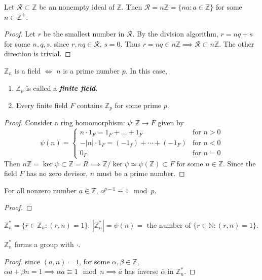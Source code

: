 \documentclass{article}
\begin{document}
\begin{multicols}{2}
\begin{mylemma}
Let $\mathcal{R}\subset \mathbb{Z}$ be an nonempty ideal of $\mathbb{Z}$. Then $\mathcal{R}=n \mathbb{Z} = \{na:a\in \mathbb{Z}\}$ for some $n\in \mathbb{Z}^+$.
\end{mylemma}
\begin{proof}
Let $r$ be the smallest number in $\mathcal{R}$. By the division algorithm, $r=nq+s$ for some $n,q,s$. since $r,nq\in \mathcal{R}$, $s=0$. Thus $r=nq\in n \mathbb{Z} \implies \mathcal{R}\subset n \mathbb{Z}$. The other direction is trivial.
\end{proof}

\begin{mytheorem}
$\mathbb{Z}_n$ is a field $\iff$ $n$ is a prime number $p$. In this case,
\begin{enumerate}[label={(\alph*)}]
\item $\mathbb{Z}_p$ is called a \textbf{\emph{finite field}}.
\item Every finite field $F$ contains $\mathbb{Z}_p$ for some prime $p$.
\end{enumerate}
\end{mytheorem}
\begin{proof}
Consider a ring homomorphism: $\psi: \mathbb{Z}\to F$ given by
$$\psi(n)=\begin{cases}
n\cdot 1_F=1_F+\dots+1_F & \text{for }n>0\\
-|n|\cdot 1_F=(-1_f)+\cdots + (-1_F) & \text{for }n<0\\
0_F & \text{for }n=0
\end{cases}$$
Then $n \mathbb{Z}=\ker \psi\subset \mathbb{Z}=R \implies \mathbb{Z}/\ker \psi \simeq \psi(\mathbb{Z})\subset F$ for some $n\in \mathbb{Z}$. Since the field $F$ has no zero devisor, $n$ must be a prime number.
\end{proof}

\begin{mylemma}
For all nonzero number $a\in \mathbb{Z}$, $a^{p-1}\equiv 1 \mod p$.
\end{mylemma}
\begin{proof}

\end{proof}

\begin{notebox}
$\mathbb{Z}_n^*=\{\overline{r}\in \mathbb{Z}_n:(r,n)=1\}$. $|\mathbb{Z}_n^*|=\psi(n)=\text{ the number of }\{r\in \mathbb{N}:(r,n)=1\}$.
\end{notebox}

\begin{mytheorem}
$\mathbb{Z}_n^*$ forms a group with $\cdot$.
\end{mytheorem}
\begin{proof}
since $(a,n)=1$, for some $\alpha,\beta\in \mathbb{Z}$, $\alpha a + \beta n = 1 \implies \alpha a \equiv 1 \mod n \implies \overline{a}$ has inverse $\overline{\alpha}$ in $\mathbb{Z}_n^*$.
\end{proof}


\end{multicols}
\end{document}
